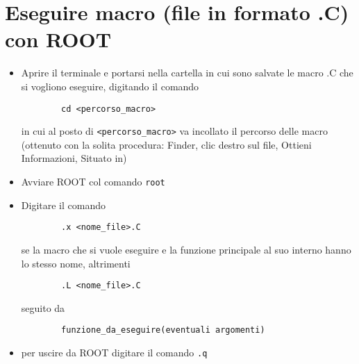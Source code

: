\section{Eseguire macro (file in formato .C) con ROOT}
\begin{itemize}
	\item Aprire il terminale e portarsi nella cartella in cui sono salvate le macro .C che si vogliono eseguire, digitando il comando
	\begin{verbatim}
		cd <percorso_macro>
	\end{verbatim}
	in cui al posto di \texttt{<percorso\_macro>} va incollato il percorso delle macro (ottenuto con la solita procedura: Finder, clic destro sul file, Ottieni Informazioni, Situato in)
	\item Avviare ROOT col comando \texttt{root}
	\item Digitare il comando
	\begin{verbatim}
		.x <nome_file>.C
	\end{verbatim}
	se la macro che si vuole eseguire e la funzione principale al suo interno hanno lo stesso nome, altrimenti
	\begin{verbatim}
		.L <nome_file>.C
	\end{verbatim}
	seguito da
	\begin{verbatim}
		funzione_da_eseguire(eventuali argomenti)
	\end{verbatim}
	\item per uscire da ROOT digitare il comando \texttt{.q}
\end{itemize}
